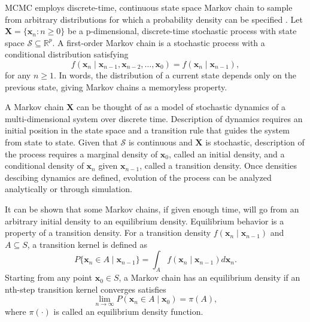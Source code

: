 \documentclass[12pt]{report}
\begin{document}
MCMC employs discrete-time, continuous state space Markov chain to sample from arbitrary distributions
for which a probability density can be specified \citep{KarTay1975,KarTay1981,Ros2014}. Let $\boldsymbol{X} = \{\boldsymbol{x}_n: n \geq 0\}$ be a p-dimensional, discrete-time stochastic process with state space $\mathcal{S} \subseteq \mathbb{R}^p$. A first-order Markov chain is a stochastic process with a conditional distribution satisfying
\begin{equation}
f(\boldsymbol{x}_n \mid \boldsymbol{x}_{n-1}, \boldsymbol{x}_{n-2}, \ldots, \boldsymbol{x}_0) = f(\boldsymbol{x}_n \mid \boldsymbol{x}_{n-1}),
\end{equation}
for any $n \geq 1$.
In words, the distribution of a current state depends only on the previous state, giving Markov chains a memoryless property. 

A Markov chain $\boldsymbol{X}$ can be thought of as a model of stochastic dynamics of a multi-dimensional system over discrete time. Description of dynamics requires an initial position in the state space and a transition rule that guides the system from state to state. Given that $\mathcal{S}$ is continuous and $\boldsymbol{X}$ is stochastic, description of the process requires a marginal density of $\boldsymbol{x}_0$, called an initial density, and a conditional density of $\boldsymbol{x}_n$ given $\boldsymbol{x}_{n-1}$, called a transition density. Once densities descibing dynamics are defined, evolution of the process can be analyzed analytically or through simulation.

It can be shown that some Markov chains, if given enough time, will go from an arbitrary initial density to an equilibrium density. Equilibrium behavior is a property of a transition density. For a transition density $f(\boldsymbol{x}_n \mid \boldsymbol{x}_{n-1})$ and $A \subseteq S$, a transition kernel is defined as
\begin{equation}
P\{\boldsymbol{x}_n \in A \mid \boldsymbol{x}_{n-1}\} = \int_A f(\boldsymbol{x}_n \mid \boldsymbol{x}_{n-1})d\boldsymbol{x}_n.
\end{equation}
Starting from any point $\boldsymbol{x}_0 \in S$, a Markov chain has an equilibrium density if an nth-step transition kernel converges satisfies
\begin{equation}
\lim_{n \to \infty}P(\boldsymbol{x}_n \in A \mid \boldsymbol{x}_{0}) = \pi(A),
\end{equation}
where $\pi(\cdot)$ is called an equilibrium density function. 
\end{document}
